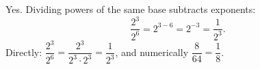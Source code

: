 Yes. Dividing powers of the same base subtracts exponents:
\[\dfrac{2^3}{2^6}=2^{3-6}=2^{-3}=\dfrac{1}{2^3}.\]
Directly: $\dfrac{2^3}{2^6}=\dfrac{2^3}{2^3\cdot2^3}=\dfrac{1}{2^3}$, and numerically $\dfrac{8}{64}=\dfrac{1}{8}$.
